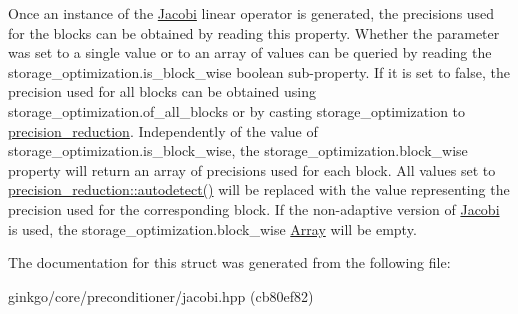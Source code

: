 Once an instance of the \hyperlink{classgko_1_1preconditioner_1_1Jacobi}{Jacobi} linear operator is generated, the precisions used for the blocks can be obtained by reading this property. Whether the parameter was set to a single value or to an array of values can be queried by reading the {\ttfamily storage\+\_\+optimization.\+is\+\_\+block\+\_\+wise} boolean sub-\/property. If it is set to {\ttfamily false}, the precision used for all blocks can be obtained using {\ttfamily storage\+\_\+optimization.\+of\+\_\+all\+\_\+blocks} or by casting {\ttfamily storage\+\_\+optimization} to {\ttfamily \hyperlink{classgko_1_1precision__reduction}{precision\+\_\+reduction}}. Independently of the value of {\ttfamily storage\+\_\+optimization.\+is\+\_\+block\+\_\+wise}, the {\ttfamily storage\+\_\+optimization.\+block\+\_\+wise} property will return an array of precisions used for each block. All values set to {\ttfamily \hyperlink{classgko_1_1precision__reduction_ac4109c61fadb24db7a1888c51ac483e9}{precision\+\_\+reduction\+::autodetect()}} will be replaced with the value representing the precision used for the corresponding block. If the non-\/adaptive version of \hyperlink{classgko_1_1preconditioner_1_1Jacobi}{Jacobi} is used, the {\ttfamily storage\+\_\+optimization.\+block\+\_\+wise} \hyperlink{classgko_1_1Array}{Array} will be empty. 

The documentation for this struct was generated from the following file\+:\begin{DoxyCompactItemize}
\item 
ginkgo/core/preconditioner/jacobi.\+hpp (cb80ef82)\end{DoxyCompactItemize}
